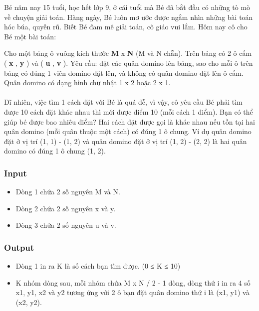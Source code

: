 



   Bé năm nay 15 tuổi, học hết lớp 9, ở cái tuổi mà Bé đã bắt đầu có những tò mò về chuyện giải toán. Hàng ngày, Bé luôn mơ ước được ngắm nhìn những bài toán hóc búa, quyến rũ. Biết Bé đam mê giải toán, cô giáo vui lắm. Hôm nay cô cho Bé một bài toán:  

   Cho một bảng ô vuông kích thước   \textbf{    M   }   x   \textbf{    N   }   (M và N chẵn). Trên bảng có 2 ô cấm (   \textbf{    x   }   ,   \textbf{    y   }   ) và (   \textbf{    u   }   ,   \textbf{    v   }   ). Yêu cầu: đặt các quân domino lên bảng, sao cho mỗi ô trên bảng có đúng 1 viên domino đặt lên, và không có quân domino đặt lên ô cấm. Quân domino có dạng hình chữ nhật 1 x 2 hoặc 2 x 1.   
\\
\\   Dĩ nhiên, việc tìm 1 cách đặt với Bé là quá dễ, vì vậy, cô yêu cầu Bé phải tìm được 10 cách đặt khác nhau thì mới được điểm 10 (mỗi cách 1 điểm). Bạn có thể giúp bé được bao nhiêu điểm? Hai cách đặt được gọi là khác nhau nếu tồn tại hai quân domino (mỗi quân thuộc một cách) có đúng 1 ô chung. Ví dụ quân domino đặt ở vị trí (1, 1) - (1, 2) và quân domino đặt ở vị trí (1, 2) - (2, 2) là hai quân domino có đúng 1 ô chung (1, 2).  

\subsubsection{   Input  }
\begin{itemize}
	\item     Dòng 1 chứa 2 số nguyên M và N.   
	\item     Dòng 2 chứa 2 số nguyên x và y.   
	\item     Dòng 3 chứa 2 số nguyên u và v.   
\end{itemize}

\subsubsection{   Output  }
\begin{itemize}
	\item     Dòng 1 in ra K là số cách bạn tìm được. (0 ≤ K ≤ 10)   
	\item     K nhóm dòng sau, mỗi nhóm chứa M x N / 2 - 1 dòng, dòng thứ i in ra 4 số x1, y1, x2 và y2 tương ứng với 2 ô bạn đặt quân domino thứ i là (x1, y1) và (x2, y2).   
\end{itemize}

